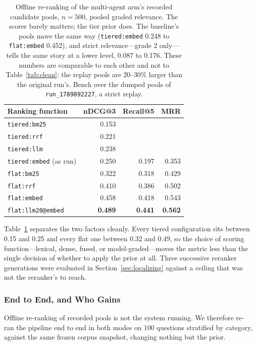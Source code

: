 \documentclass[acmsmall,review,anonymous,screen]{acmart}
\begin{document}
\begin{table}[t]
\caption{Offline re-ranking of the multi-agent arm's recorded candidate pools,
$n=500$, pooled graded relevance. The scorer barely matters; the tier prior
does. The baseline's pools move the same way (\texttt{tiered:embed} 0.248 to
\texttt{flat:embed} 0.452), and strict relevance---grade 2 only---tells the
same story at a lower level, 0.087 to 0.176. These numbers are comparable to
each other and not to Table~\ref{tab:clean}: the replay pools are 20--30\%
larger than the original run's. Bench over the dumped pools of
\texttt{run\_1789892227}, a strict replay.}
\label{tab:tier-offline}
\begin{tabular}{lrrr}
\toprule
Ranking function & nDCG@3 & Recall@5 & MRR \\
\midrule
\texttt{tiered:bm25}   & 0.153 & & \\
\texttt{tiered:rrf}    & 0.221 & & \\
\texttt{tiered:llm}    & 0.238 & & \\
\texttt{tiered:embed} (as run) & 0.250 & 0.197 & 0.353 \\
\midrule
\texttt{flat:bm25}     & 0.322 & 0.318 & 0.429 \\
\texttt{flat:rrf}      & 0.410 & 0.386 & 0.502 \\
\texttt{flat:embed}    & 0.458 & 0.418 & 0.543 \\
\texttt{flat:llm20@embed} & \textbf{0.489} & \textbf{0.441} & \textbf{0.562} \\
\bottomrule
\end{tabular}
\end{table}

Table~\ref{tab:tier-offline} separates the two factors cleanly. Every tiered
configuration sits between 0.15 and 0.25 and every flat one between 0.32 and
0.49, so the choice of scoring function---lexical, dense, fused, or
model-graded---moves the metric less than the single decision of whether to
apply the prior at all. Three successive reranker generations were evaluated in
Section~\ref{sec:localizing} against a ceiling that was not the reranker's to
reach.

\subsubsection{End to End, and Who Gains}

Offline re-ranking of recorded pools is not the system running. We therefore
re-ran the pipeline end to end in both modes on 100 questions stratified by
category, against the same frozen corpus snapshot, changing nothing but the
prior.
\end{document}
